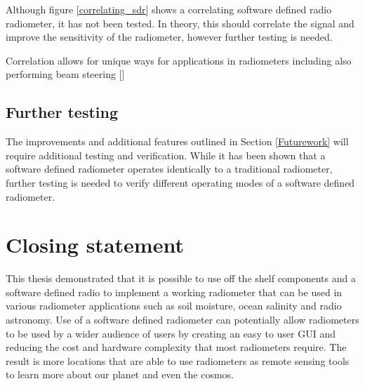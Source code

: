 Although figure \ref{correlating_sdr} shows a correlating software defined radio radiometer, it has not been tested.  In theory, this should correlate the signal and improve the sensitivity of the radiometer, however further testing is needed.

Correlation allows for unique ways for applications in radiometers including also performing beam steering [\cite{villarino02}]

\subsection{Further testing}
The improvements and additional features outlined in Section \ref{Futurework} will require additional testing and verification.  While it has been shown that a software defined radiometer operates identically to a traditional radiometer, further testing is needed to verify different operating modes of a software defined radiometer.

\section{Closing statement}
This thesis demonstrated that it is possible to use off the shelf components and a software defined radio to implement a working radiometer that can be used in various radiometer applications such as soil moisture, ocean salinity and radio astronomy.  Use of a software defined radiometer can potentially allow radiometers to be used by a wider audience of users by creating an easy to user GUI and reducing the cost and hardware complexity that most radiometers require.  The result is more locations that are able to use radiometers as remote sensing tools to learn more about our planet and even the cosmos.
